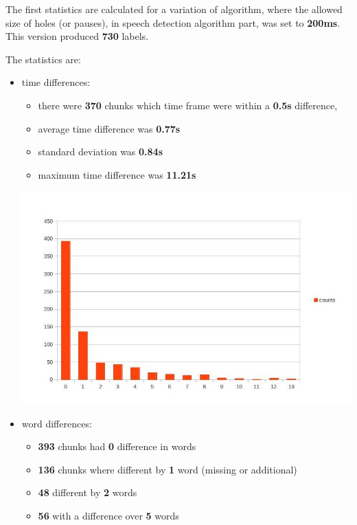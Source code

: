 \documentclass[12pt,a4paper,english]{article}
\begin{document}
\newpage

The first statistics are calculated for a variation of algorithm, where the allowed size of holes (or pauses), in speech detection algorithm part,
was set to \textbf{200ms}. This version produced \textbf{730} labels. \newline

The statistics are:
\begin{itemize}
    \item time differences: \newline
    \begin{itemize}
        \item there were \textbf{370} chunks which time frame were within a \textbf{0.5s} difference, 
        \item average time difference was \textbf{0.77s}
        \item standard deviation was \textbf{0.84s}
        \item maximum time difference was \textbf{11.21s}
    \end{itemize}
    \begin{center}
        \includegraphics[scale=0.6]{length_based_results_better.jpg}
    \end {center}
    \item word differences:
    \begin{itemize}
        \item \textbf{393} chunks had \textbf{0} difference in words
        \item \textbf{136} chunks where different by \textbf{1} word (missing or additional)
        \item \textbf{48} different by \textbf{2} words
        \item \textbf{56} with a difference over \textbf{5} words
    \end{itemize}
\end{itemize}
\end{document}
